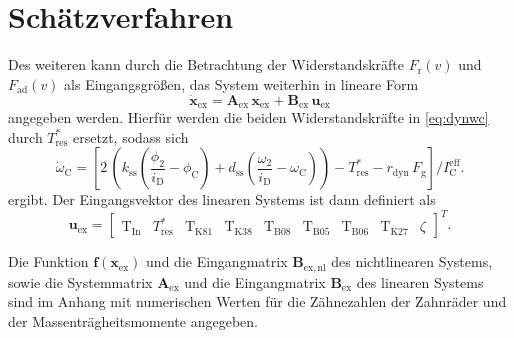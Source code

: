 \chapter{Schätzverfahren}\label{ch:ch3}


Des weiteren kann durch die Betrachtung der Widerstandskräfte $F_\mathrm{r}(v)$ und $F_\mathrm{ad}(v)$ als Eingangsgrößen, das System weiterhin in lineare Form
\begin{equation}\label{eq:sys_linex}
\dot{\pmb{x}}_\mathrm{ex} = \pmb{A}_\mathrm{ex}\,\pmb{x}_\mathrm{ex} + \pmb{B}_\mathrm{ex}\,\pmb{u}_\mathrm{ex}
\end{equation}
angegeben werden. Hierfür werden die beiden Widerstandskräfte in \eqref{eq:dynwc} durch $T^*_\mathrm{res}$ ersetzt, sodass sich 
\begin{equation}\label{eq:dynwc_lin}
\dot{\omega}_\mathrm{C} = \left[ 2\,\left(k_\mathrm{ss}\left(\frac{\phi_2}{i_{\mathrm{D}}} - \phi_\mathrm{C}\right) + d_\mathrm{ss}\left(\frac{\omega_2}{i_{\mathrm{D}}} - \omega_\mathrm{C}\right)\right) - T^*_\mathrm{res} - r_\mathrm{dyn}\, F_\mathrm{g}\right]/I^\mathrm{eff}_\mathrm{C}.
\end{equation}
 ergibt. Der Eingangsvektor des linearen Systems ist dann definiert als 
\begin{equation}
\pmb{u}_\mathrm{ex} = \begin{bmatrix} \mathrm{T}_{\mathrm{In}} & T^*_\mathrm{res} & \mathrm{T}_{\mathrm{K81}} & \mathrm{T}_{\mathrm{K38}} & \mathrm{T}_{\mathrm{B08}} & \mathrm{T}_{\mathrm{B05}} & \mathrm{T}_{\mathrm{B06}} & \mathrm{T}_{\mathrm{K27}} & \zeta \end{bmatrix}^T.
\end{equation}

Die Funktion $\pmb{f}(\pmb{x}_\mathrm{ex})$ und die Eingangmatrix $\pmb{B}_\mathrm{ex,nl}$ des nichtlinearen Systems, sowie die Systemmatrix $\pmb{A}_\mathrm{ex}$ und die Eingangmatrix $\pmb{B}_\mathrm{ex}$ des linearen Systems sind im Anhang mit numerischen Werten für die Zähnezahlen der Zahnräder und der Massenträgheitsmomente angegeben.



